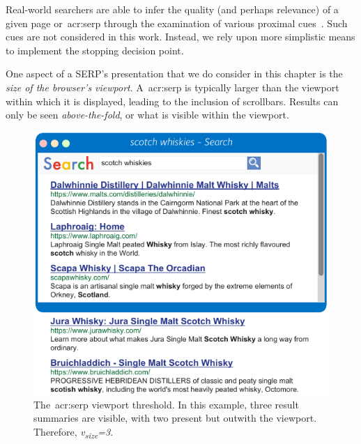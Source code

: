 Real-world searchers are able to infer the quality (and perhaps relevance) of a given page or~\gls{acr:serp} through the examination of various proximal cues~\citep{chi2001information_scent}. Such cues are not considered in this work. Instead, we rely upon more simplistic means to implement the stopping decision point.

One aspect of a SERP's presentation that we do consider in this chapter is the \emph{size of the browser's viewport}. A~\gls{acr:serp} is typically larger than the viewport within which it is displayed, leading to the inclusion of scrollbars. Results can only be seen \emph{above-the-fold}, or what is visible within the viewport.

\begin{figure}
    \begin{center}
    \vspace*{-9mm}
    \includegraphics[width=1\textwidth]{figures/ch6-viewport.pdf}
    \end{center}
    \vspace*{-2mm}
    \caption[Viewport cutoff example]{The~\gls{acr:serp} viewport threshold. In this example, three result summaries are visible, with two present but outwith the viewport. Therefore, \emph{v\textsubscript{size}=3}.}
    \label{fig:viewport_cutoff}
\end{figure}

